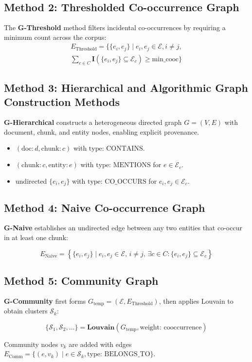 \documentclass{article}
\theoremstyle{plain}
\theoremstyle{definition}
\theoremstyle{remark}
\begin{document}
\subsection{Method 2: Thresholded Co-occurrence Graph}
The \textbf{G-Threshold} method filters incidental co-occurrences by requiring a minimum count across the corpus:
\begin{multline}
    E_{\text{Threshold}} = \{\{e_i, e_j\} \mid e_i, e_j \in \mathcal{E}, i \neq j, \\ 
    \sum_{c \in C} \mathbf{I}(\{e_i, e_j\} \subseteq \mathcal{E}_c) \ge \text{min\_cooc} \}
\end{multline}

\subsection{Method 3: Hierarchical and Algorithmic Graph Construction Methods}
\textbf{G-Hierarchical} constructs a heterogeneous directed graph $G=(V, E)$ with document, chunk, and entity nodes, enabling explicit provenance.
\begin{itemize}
    \item $(\text{doc}:d, \text{chunk}:c)$ with $\text{type: CONTAINS}$.
    \item $(\text{chunk}:c, \text{entity}:e)$ with $\text{type: MENTIONS}$ for $e \in \mathcal{E}_c$.
    \item undirected $\{e_i, e_j\}$ with $\text{type: CO\_OCCURS}$ for $e_i, e_j \in \mathcal{E}_c$.
\end{itemize}

\subsection{Method 4: Naive Co-occurrence Graph}
\textbf{G-Naive} establishes an undirected edge between any two entities that co-occur in at least one chunk:
\begin{tiny}
\begin{equation}
E_{\text{Naive}} = \left\{ \{e_i, e_j\} \mid e_i, e_j \in \mathcal{E}, \, i \neq j, \, \exists c \in C : \{e_i, e_j\} \subseteq \mathcal{E}_c \right\}
\end{equation}
\end{tiny}

\subsection{Method 5: Community Graph}
\textbf{G-Community} first forms $G_{\text{temp}}=(\mathcal{E}, E_{\text{Threshold}})$, then applies Louvain to obtain clusters $\mathcal{S}_k$:
\begin{small}
\begin{equation}
\{\mathcal{S}_1, \mathcal{S}_2, \dots\} = \mathbf{Louvain}(G_{\text{temp}}, \text{weight: cooccurrence})
\end{equation}
\end{small}
Community nodes $v_k$ are added with edges $E_{\text{Comm}} = \{ (e, v_k) \mid e \in \mathcal{S}_k, \text{type: BELONGS\_TO} \}$.
\end{document}
